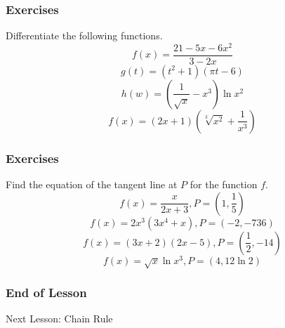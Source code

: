 \documentclass[xcolor=dvipsnames]{beamer}
\begin{document}
\begin{frame}
  \frametitle{Exercises}
  {\ubung} Differentiate the following functions.
  \begin{equation}
    \label{eq:oilaathu}
f(x)=\frac{21-5x-6x^{2}}{3-2x}
  \end{equation}
  \begin{equation}
    \label{eq:ceengewo}
    g(t)=(t^{2}+1)(\pi{}t-6)
  \end{equation}
  \begin{equation}
    \label{eq:oocohzah}
    h(w)=\left(\frac{1}{\sqrt{x}}-x^{3}\right)\ln{}x^{2}
  \end{equation}
  \begin{equation}
    \label{eq:shooquie}
    f(x)=(2x+1)\left(\sqrt[3]{x^{2}}+\frac{1}{x^{3}}\right)
  \end{equation}
\end{frame}

\begin{frame}
  \frametitle{Exercises}
  {\ubung} Find the equation of the tangent line at $P$ for the
  function $f$.
  \begin{equation}
    \label{eq:ohtaiyex}
    f(x)=\frac{x}{2x+3},P=\left(1,\frac{1}{5}\right)
  \end{equation}
  \begin{equation}
    \label{eq:eivibeed}
    f(x)=2x^{3}(3x^{4}+x),P=\left(-2,-736\right)
  \end{equation}
  \begin{equation}
    \label{eq:miengeit}
    f(x)=(3x+2)(2x-5),P=\left(\frac{1}{2},-14\right)
  \end{equation}
  \begin{equation}
    \label{eq:aliheehe}
    f(x)=\sqrt{x}\ln{}x^{3},P=\left(4,12\ln{}2\right)
  \end{equation}
\end{frame}

\begin{frame}
  \frametitle{End of Lesson}
Next Lesson: Chain Rule
\end{frame}
\end{document}
